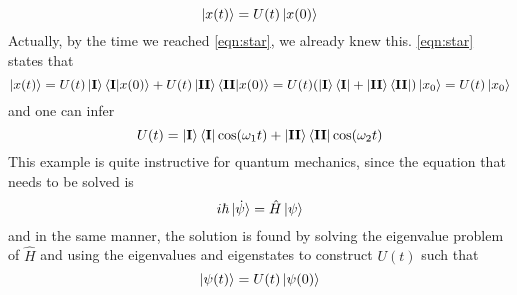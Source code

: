 \documentclass{article}
\begin{document}
\begin{equation*} \ket{x(t)} = U(t)\ket{x(0)} \end{equation*}
Actually, by the time we reached \eqref{eqn:star}, we already knew this. \eqref{eqn:star} states that
\begin{equation*} \ket{x(t)} = U(t)\ket{\textbf{I}}\braket{\textbf{I}|x(0)} + U(t)\ket{\textbf{II}}\braket{\textbf{II}|x(0)} = U(t)(\ket{\textbf{I}}\bra{\textbf{I}} + \ket{\textbf{II}}\bra{\textbf{II}})\ket{x_0} = U(t)\ket{x_0} \end{equation*}
and one can infer
\begin{equation*} U(t) = \ket{\textbf{I}}\bra{\textbf{I}}\cos(\omega_1 t)  + \ket{\textbf{II}}\bra{\textbf{II}}\cos(\omega_2 t) \end{equation*}
This example is quite instructive for quantum mechanics, since the equation that needs to be solved is \begin{equation*} i\hbar\ket{\dot{\psi}} = \hat{H}\ket{\psi} \end{equation*}
and in the same manner, the solution is found by solving the eigenvalue problem of $\hat{H}$ and using the eigenvalues and eigenstates to construct $U(t)$ such that 
\begin{equation*} \ket{\psi(t)} = U(t)\ket{\psi(0)} \end{equation*}
\end{document}
